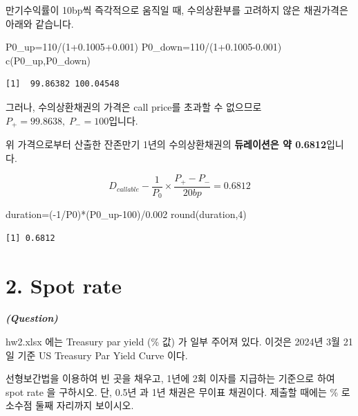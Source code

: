 \documentclass[
  letterpaper,
  DIV=11,
  numbers=noendperiod]{scrreprt}
\newenvironment{Shaded}{\begin{snugshade}}{\end{snugshade}}
\newcommand{\DecValTok}[1]{\textcolor[rgb]{0.68,0.00,0.00}{#1}}
\newcommand{\FloatTok}[1]{\textcolor[rgb]{0.68,0.00,0.00}{#1}}
\newcommand{\FunctionTok}[1]{\textcolor[rgb]{0.28,0.35,0.67}{#1}}
\newcommand{\NormalTok}[1]{\textcolor[rgb]{0.00,0.23,0.31}{#1}}
\newcommand{\OtherTok}[1]{\textcolor[rgb]{0.00,0.23,0.31}{#1}}
\newcommand{\SpecialCharTok}[1]{\textcolor[rgb]{0.37,0.37,0.37}{#1}}
\begin{document}
만기수익률이 10bp씩 즉각적으로 움직일 때, 수의상환부를 고려하지 않은
채권가격은 아래와 같습니다.

\begin{Shaded}
\begin{Highlighting}[]
\NormalTok{P0\_up}\OtherTok{=}\DecValTok{110}\SpecialCharTok{/}\NormalTok{(}\DecValTok{1}\FloatTok{+0.1005+0.001}\NormalTok{)}
\NormalTok{P0\_down}\OtherTok{=}\DecValTok{110}\SpecialCharTok{/}\NormalTok{(}\DecValTok{1}\FloatTok{+0.1005{-}0.001}\NormalTok{)}
\FunctionTok{c}\NormalTok{(P0\_up,P0\_down)}
\end{Highlighting}
\end{Shaded}

\begin{verbatim}
[1]  99.86382 100.04548
\end{verbatim}

그러나, 수의상환채권의 가격은 call price를 초과할 수 없으므로
\textbf{\(P_+=99.8638,\;P_-=100\)}입니다.

위 가격으로부터 산출한 잔존만기 1년의 수의상환채권의 \textbf{듀레이션은
약 0.6812}입니다.

\[D_{callable}-\frac{1}{P_0}\times\frac{P_+-P_-}{20bp}=0.6812\]

\begin{Shaded}
\begin{Highlighting}[]
\NormalTok{duration}\OtherTok{=}\NormalTok{(}\SpecialCharTok{{-}}\DecValTok{1}\SpecialCharTok{/}\NormalTok{P0)}\SpecialCharTok{*}\NormalTok{(P0\_up}\DecValTok{{-}100}\NormalTok{)}\SpecialCharTok{/}\FloatTok{0.002}
\FunctionTok{round}\NormalTok{(duration,}\DecValTok{4}\NormalTok{)}
\end{Highlighting}
\end{Shaded}

\begin{verbatim}
[1] 0.6812
\end{verbatim}

\section*{2. Spot rate}\label{spot-rate}


\textbf{\emph{(Question)}}

hw2.xlsx 에는 Treasury par yield (\% 값) 가 일부 주어져 있다. 이것은
2024년 3월 21일 기준 US Treasury Par Yield Curve 이다.

선형보간법을 이용하여 빈 곳을 채우고, 1년에 2회 이자를 지급하는 기준으로
하여 spot rate 을 구하시오. 단, 0.5년 과 1년 채권은 무이표 채권이다.
제출할 때에는 \% 로 소수점 둘째 자리까지 보이시오.
\end{document}
